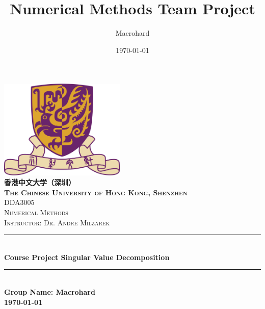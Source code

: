 \title{Numerical Methods Team Project} %
\author{Macrohard}%
\date{\today}%





\begin{titlepage}
    \centering
    \vspace*{0.5 cm}
    \includegraphics[scale = 0.75,width=6cm]{CUHK}\\[1.0 cm]   %
    \textsc{\Large \textbf{香港中文大学（深圳）}}\\
    \textsc{\large \textbf{The Chinese University of Hong Kong, Shenzhen}}\\[1.0 cm] 
    \textsc{\Large DDA3005}\\[0.5 cm] 
    \textsc{\Large Numerical Methods}\\[0.5 cm]               %
    \textsc{\large Instructor: Dr. Andre Milzarek}\\[0.5 cm]
    \rule{\linewidth}{0.2 mm} \\[0.4 cm]
    { \huge \bfseries Course Project
     Singular Value Decomposition}\\
    \rule{\linewidth}{0.2 mm} \\[1.5 cm]
    {\LARGE \bfseries Group Name: Macrohard}\\[0.3 cm] 
    {\Large \bfseries \today}
 
\clearpage


\end{titlepage}
